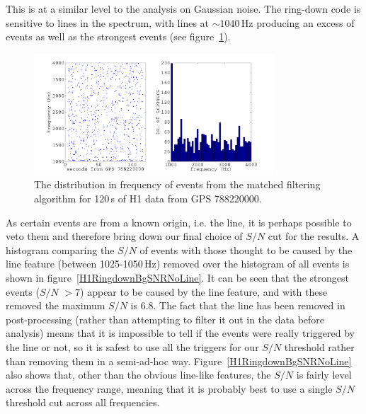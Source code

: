 This is at a similar level to the analysis on Gaussian noise. The ring-down code is sensitive to
lines in the spectrum, with lines at $\sim 1040$\,Hz producing an excess of events as well as the
strongest events (see figure~\ref{H1RingdownBgFreq}).
\begin{figure}[!htbp]
\begin{center}
\includegraphics[width=0.8\textwidth]{figs/H1RingdownBgFreq}\caption{The distribution
in frequency of events from the matched filtering algorithm for 120\,s of H1 data from GPS
788220000.}\label{H1RingdownBgFreq}
\end{center}
\end{figure}
As certain events are from a known origin, i.e. the line, it is perhaps possible to veto them and
therefore bring down our final choice of $S/N$ cut for the results. A histogram comparing the $S/N$
of events with those thought to be caused by the line feature (between 1025-1050\,Hz) removed over
the histogram of all events is shown in figure~\ref{H1RingdownBgSNRNoLine}. It can be seen that the
strongest events ($S/N$ $> 7$) appear to be caused by the line feature, and with these removed the
maximum $S/N$ is 6.8. The fact that the line has been removed in post-processing (rather than
attempting to filter it out in the data before analysis) means that it is impossible to tell if the
events were really triggered by the line or not, so it is safest to use all the triggers for our
$S/N$ threshold rather than removing them in a semi-ad-hoc way. Figure~\ref{H1RingdownBgSNRNoLine}
also shows that, other than the obvious line-like features, the $S/N$ is fairly level across the
frequency range, meaning that it is probably best to use a single $S/N$ threshold cut across all
frequencies.
